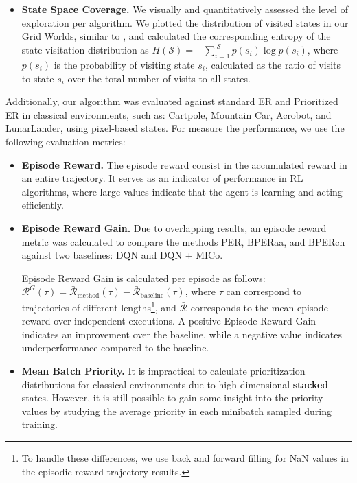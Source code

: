 \begin{itemize}
    \item \textbf{State Space Coverage.} We visually and quantitatively assessed the level of exploration per algorithm. We plotted the distribution of visited states in our Grid Worlds, similar to \cite{pan2022understanding}, and calculated the corresponding entropy of the state visitation distribution as $H(\mathcal{S}) = - \sum_{i=1}^{|\mathcal{S}|} p(s_i) \log p(s_i)$, where \(p(s_i)\) is the probability of visiting state \(s_i\), calculated as the ratio of visits to state \(s_i\) over the total number of visits to all states.
\end{itemize}


Additionally, our algorithm was evaluated against standard ER and Prioritized ER in classical environments, such as: Cartpole, Mountain Car, Acrobot, and LunarLander, using pixel-based states. For measure the performance, we use the following evaluation metrics:
\begin{itemize}
    \item \textbf{Episode Reward.} The episode reward consist in the accumulated reward in an entire trajectory. It serves as an indicator of performance in RL algorithms, where large values indicate that the agent is learning and acting efficiently.

    \item \textbf{Episode Reward Gain.} Due to overlapping results, an episode reward metric was calculated to compare the methods PER, BPERaa, and BPERcn against two baselines: DQN and DQN + MICo.
    
    Episode Reward Gain is calculated per episode as follows: \(\mathcal{R}^G(\tau) = \bar{\mathcal{R}}_{\text{method}}(\tau) - \bar{\mathcal{R}}_{\text{baseline}}(\tau)\), where \(\tau\) can correspond to trajectories of different lengths\footnote{To handle these differences, we use back and forward filling for NaN values in the episodic reward trajectory results.}, and $\bar{\mathcal{R}}$ corresponds to the mean episode reward over independent executions. A positive Episode Reward Gain indicates an improvement over the baseline, while a negative value indicates underperformance compared to the baseline.
    \item \textbf{Mean Batch Priority.} It is impractical to calculate prioritization distributions for classical environments due to high-dimensional \textbf{stacked} states. However, it is still possible to gain some insight into the priority values by studying the average priority in each minibatch sampled during training.
\end{itemize}

